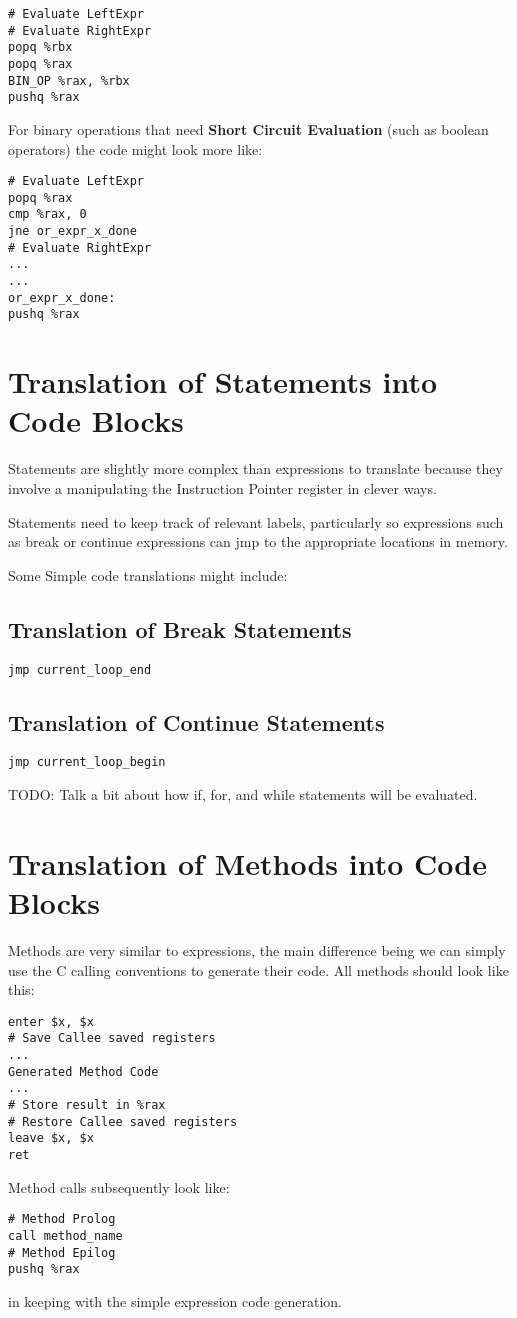 \documentclass[11pt]{article}
\begin{document}
\begin{verbatim}
# Evaluate LeftExpr
# Evaluate RightExpr
popq %rbx
popq %rax
BIN_OP %rax, %rbx
pushq %rax
\end{verbatim}

For binary operations that need \textbf{Short Circuit Evaluation} (such as boolean operators) the code might look more like: 

\begin{verbatim}
# Evaluate LeftExpr
popq %rax 
cmp %rax, 0
jne or_expr_x_done
# Evaluate RightExpr
...
...
or_expr_x_done: 
pushq %rax
\end{verbatim}


\section {Translation of Statements into Code Blocks}
Statements are slightly more complex than expressions to translate because they involve a manipulating the Instruction Pointer register in clever ways. 

Statements need to keep track of relevant labels, particularly so expressions such as break or continue expressions can jmp to the appropriate locations in memory. 

Some Simple code translations might include: 

\subsection{Translation of Break Statements} 

\begin{verbatim}
jmp current_loop_end
\end{verbatim}

\subsection{Translation of Continue Statements}

\begin{verbatim}
jmp current_loop_begin
\end{verbatim}

TODO: Talk a bit about how if, for, and while statements will be evaluated. 

\section {Translation of Methods into Code Blocks}
Methods are very similar to expressions, the main difference being we can simply use the C calling conventions to generate their code. All methods should look like this: 

\begin{verbatim}
enter $x, $x
# Save Callee saved registers
...
Generated Method Code
...
# Store result in %rax
# Restore Callee saved registers
leave $x, $x
ret
\end{verbatim}

Method calls subsequently look like: 
\begin{verbatim}
# Method Prolog
call method_name
# Method Epilog
pushq %rax
\end{verbatim}

in keeping with the simple expression code generation. 
\end{document}
